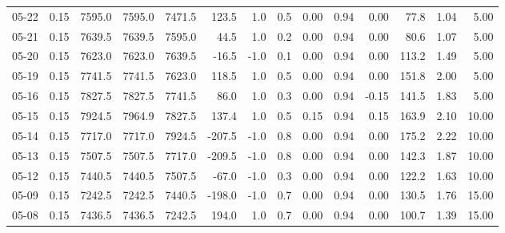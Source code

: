 \begin{threeparttable}
{\begin{tabular}{lrrrrrrrrrrrrr}
  05-22 &     0.15 & 7595.0 & 7595.0 & 7471.5 &      123.5 &                      1.0 &                 0.5 &       0.00 &      0.94 &           0.00 &             77.8 &            1.04 &                   5.00 \\
  05-21 &     0.15 & 7639.5 & 7639.5 & 7595.0 &       44.5 &                      1.0 &                 0.2 &       0.00 &      0.94 &           0.00 &             80.6 &            1.07 &                   5.00 \\
  05-20 &     0.15 & 7623.0 & 7623.0 & 7639.5 &      -16.5 &                     -1.0 &                 0.1 &       0.00 &      0.94 &           0.00 &            113.2 &            1.49 &                   5.00 \\
  05-19 &     0.15 & 7741.5 & 7741.5 & 7623.0 &      118.5 &                      1.0 &                 0.5 &       0.00 &      0.94 &           0.00 &            151.8 &            2.00 &                   5.00 \\
  05-16 &     0.15 & 7827.5 & 7827.5 & 7741.5 &       86.0 &                      1.0 &                 0.3 &       0.00 &      0.94 &          -0.15 &            141.5 &            1.83 &                   5.00 \\
  05-15 &     0.15 & 7924.5 & 7964.9 & 7827.5 &      137.4 &                      1.0 &                 0.5 &       0.15 &      0.94 &           0.15 &            163.9 &            2.10 &                  10.00 \\
  05-14 &     0.15 & 7717.0 & 7717.0 & 7924.5 &     -207.5 &                     -1.0 &                 0.8 &       0.00 &      0.94 &           0.00 &            175.2 &            2.22 &                  10.00 \\
  05-13 &     0.15 & 7507.5 & 7507.5 & 7717.0 &     -209.5 &                     -1.0 &                 0.8 &       0.00 &      0.94 &           0.00 &            142.3 &            1.87 &                  10.00 \\
  05-12 &     0.15 & 7440.5 & 7440.5 & 7507.5 &      -67.0 &                     -1.0 &                 0.3 &       0.00 &      0.94 &           0.00 &            122.2 &            1.63 &                  10.00 \\
  05-09 &     0.15 & 7242.5 & 7242.5 & 7440.5 &     -198.0 &                     -1.0 &                 0.7 &       0.00 &      0.94 &           0.00 &            130.5 &            1.76 &                  15.00 \\
  05-08 &     0.15 & 7436.5 & 7436.5 & 7242.5 &      194.0 &                      1.0 &                 0.7 &       0.00 &      0.94 &           0.00 &            100.7 &            1.39 &                  15.00 \\

\end{tabular}}
\end{threeparttable}
